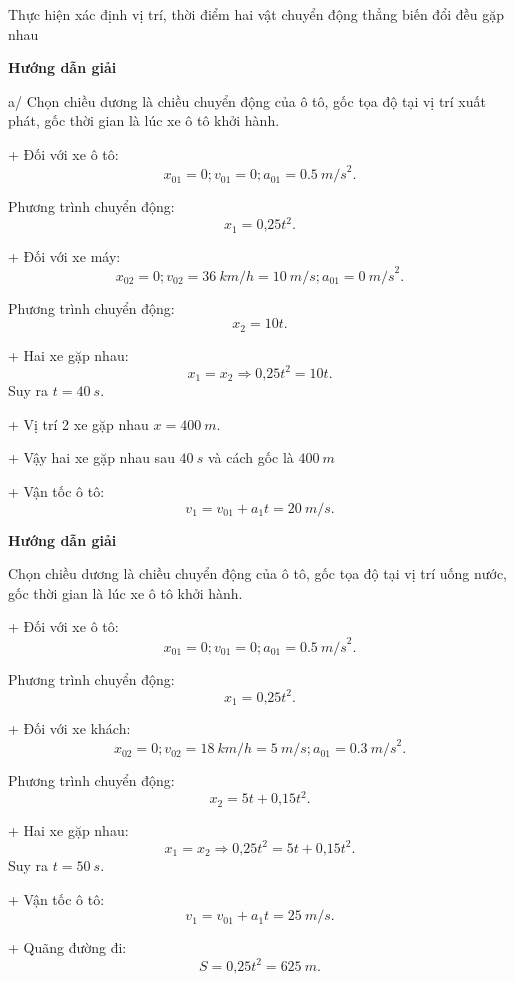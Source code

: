 \begin{dang}{Thực hiện xác định vị trí, thời điểm hai vật chuyển động thẳng biến đổi đều gặp nhau}
	{	\begin{center}
			\textbf{Hướng dẫn giải}
		\end{center}
		
		a/ Chọn chiều dương là chiều chuyển động của ô tô, gốc tọa độ tại vị trí xuất phát, gốc thời gian là lúc xe ô tô khởi hành.
		
		+ Đối với xe ô tô:
		$$x_{01} = 0; v_{01} = 0; a_{01} = \SI{0,5}{m/s}^2.$$	
		
		Phương trình chuyển động:
		$$x_1 = \text{0,25}t^2.$$
		
		+ Đối với xe máy:
		$$x_{02} = 0; v_{02} =\SI{36}{km/h}=\SI{10}{m/s}; a_{01} = \SI{0}{m/s}^2.$$	
		
		Phương trình chuyển động:
		$$x_2 =10t.$$
		
		+ Hai xe gặp nhau:
		$$x_1=x_2 \Rightarrow \text{0,25}t^2=10t.$$
		Suy ra $t =\SI{40}{s}.$
		
		+ Vị trí 2 xe gặp nhau $x = \SI{400}{m}$.
		
		+ Vậy hai xe gặp nhau sau $\SI{40}{s}$ và cách gốc là $\SI{400}{m}$
		
		+ Vận tốc ô tô:
		$$v_1 = v_{01}+ a_1t = \SI{20}{m/s}.$$  
		
	}
	{	\begin{center}
			\textbf{Hướng dẫn giải}
		\end{center}
		
		Chọn chiều dương là chiều chuyển động của ô tô, gốc tọa độ tại vị trí uống nước, gốc thời gian là lúc xe ô tô khởi hành.
		
		+ Đối với xe ô tô:
		$$x_{01} = 0; v_{01} = 0; a_{01} = \SI{0,5}{m/s}^2.$$	
		
		Phương trình chuyển động:
		$$x_1 = \text{0,25}t^2.$$
		
		+ Đối với xe khách:
		$$x_{02} = 0; v_{02} =\SI{18}{km/h}=\SI{5}{m/s}; a_{01} = \SI{0,3}{m/s}^2.$$	
		
		Phương trình chuyển động:
		$$x_2 =5t+\text{0,15}t^2.$$
		
		+ Hai xe gặp nhau:
		$$x_1=x_2 \Rightarrow \text{0,25}t^2=5t+\text{0,15}t^2.$$
		Suy ra $t =\SI{50}{s}.$
		
		+ Vận tốc ô tô:
		$$v_1 = v_{01}+ a_1t = \SI{25}{m/s}.$$  
		
		+ Quãng đường đi:
		$$S =\text{0,25}t^2 = \SI{625}{m}.$$	
	}
\end{dang}
